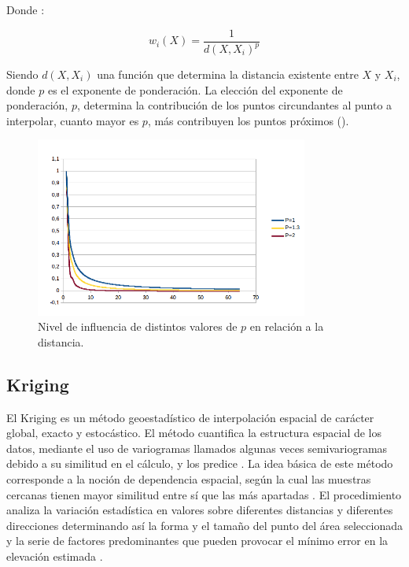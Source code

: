 Donde :

\begin{equation}
w_i(X) =  \frac{1}{d(X, X_i)^p}
\end{equation}

Siendo $d(X, X_i)$ una función que determina la distancia existente entre $X$ y $X_{i}$, donde $p$
es el exponente de ponderación. La elección del exponente de ponderación, $p$, determina la
contribución de los puntos circundantes al punto a interpolar, cuanto mayor es $p$, más
contribuyen los puntos próximos ().

\begin{figure}[H]
\centering
\includegraphics[width=0.8\textwidth]{capitulo-2/graphics/idw-parametros.png}
\caption{\label{fig:sig-idw-parametros} Nivel de influencia de distintos valores de $p$ en
relación a la distancia.}

\end{figure}

\subsection{Kriging}
El Kriging es un método geoestadístico de interpolación espacial de carácter global, exacto y
estocástico\citep{NINO2011}. El método cuantifica la estructura espacial de los datos, mediante el
uso de variogramas llamados algunas veces semivariogramas debido a su similitud en el cálculo, y
los predice \citep{villatoro2007comparacion}. La idea básica de este método corresponde a la
noción de dependencia espacial, según la cual las muestras cercanas tienen mayor similitud entre
sí que las más apartadas \citep{NINO2011}. El procedimiento analiza la variación estadística en
valores sobre diferentes distancias y diferentes direcciones determinando así la forma y el tamaño
del punto del área seleccionada y la serie de factores predominantes que pueden provocar el mínimo
error en la elevación estimada \citep{cPachecoMDE2003}.

